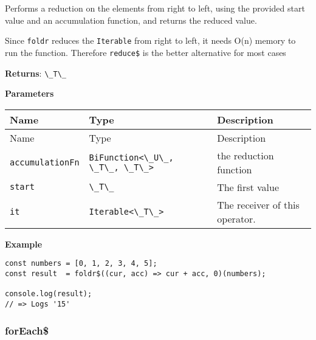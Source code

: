Performs a reduction on the elements from right to left, using the
provided start value and an accumulation function, and returns the
reduced value.

Since \passthrough{\lstinline!foldr!} reduces the
\passthrough{\lstinline!Iterable!} from right to left, it needs O(n)
memory to run the function. Therefore \passthrough{\lstinline!reduce$!}
is the better alternative for most cases

\textbf{Returns}: \passthrough{\lstinline!\_T\_!}

\textbf{Parameters}

\begin{longtable}[]{
  >{\raggedright\arraybackslash}p{}
  >{\raggedright\arraybackslash}p{}
  >{\raggedright\arraybackslash}p{}@{}}

\toprule\noalign{}
Name & Type & Description \\
\midrule\noalign{}
\endfirsthead
\toprule\noalign{}
Name & Type & Description \\
\midrule\noalign{}
\endhead
\bottomrule\noalign{}
\endlastfoot
\passthrough{\lstinline!accumulationFn!} &
\passthrough{\lstinline!BiFunction<\_U\_, \_T\_, \_T\_>!} & the
reduction function \\
\passthrough{\lstinline!start!} & \passthrough{\lstinline!\_T\_!} & The
first value \\
\passthrough{\lstinline!it!} & \passthrough{\lstinline!Iterable<\_T\_>!}
& The receiver of this operator. \\
\end{longtable}

\textbf{Example}

\begin{lstlisting}[label=899c82bd-0132-4f44-bf93-a84abb761f92]
const numbers = [0, 1, 2, 3, 4, 5];
const result  = foldr$((cur, acc) => cur + acc, 0)(numbers);
                                                            
console.log(result);
// => Logs '15'
\end{lstlisting}

\hypertarget{ae20de4d-81d9-49b3-a519-ce7fcad4bf13}{%
\subsubsection{forEach\$}\label{ae20de4d-81d9-49b3-a519-ce7fcad4bf13}}

